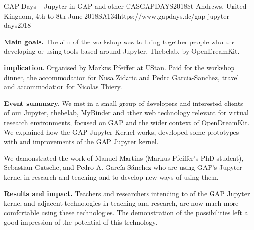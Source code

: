 \begin{event}{GAP Days -- Jupyter in GAP and other CAS}{GAPDAYS2018}{St Andrews, United Kingdom, 4th to 8th June 2018}{SA}{13}{4}{https://www.gapdays.de/gap-jupyter-days2018}

\textbf{Main goals.} The aim of the workshop was to bring together people who are developing or using tools based around Jupyter, Thebelab, by OpenDreamKit.

\textbf{\ODK implication.} Organised by Markus Pfeiffer at UStan. \ODK Paid for
the workshop dinner, the accommodation for Nusa Zidaric and Pedro
Garcia-Sanchez, travel and accommodation for Nicolas Thiery.

\textbf{Event summary.} We met in a small group of developers and interested
clients of our Jupyter, thebelab, MyBinder and other web technology relevant for
virtual research environments, focused on GAP and the wider context of
OpenDreamKit. We explained how the GAP Jupyter Kernel works, developed some
prototypes with and improvements of the GAP Jupyter kernel.

We demonstrated the work of Manuel Martins (Markus Pfeiffer's PhD student),
Sebastian Gutsche, and Pedro A. García-Sánchez who are using GAP's Jupyter
kernel in research and teaching and to develop new ways of using them.

\textbf{Results and impact.} Teachers and researchers intending to of the GAP
Jupyter kernel and adjacent technologies in teaching and research, are now much
more comfortable using these technologies. The demonstration of the
possibilities left a good impression of the potential of this technology.

\end{event}
